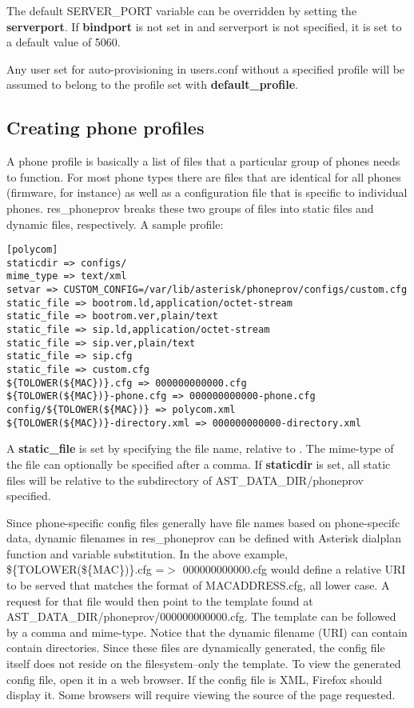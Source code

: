 The default SERVER\_PORT variable can be overridden by setting the \textbf{serverport}.
If \textbf{bindport} is not set in  and serverport is not specified, it 
is set to a default value of 5060.

Any user set for auto-provisioning in users.conf without a specified profile will be 
assumed to belong to the profile set with \textbf{default\_profile}.

\subsection{Creating phone profiles}

A phone profile is basically a list of files that a particular group of phones needs to 
function.  For most phone types there are files that are identical for all phones 
(firmware, for instance) as well as a configuration file that is specific to individual 
phones.  res\_phoneprov breaks these two groups of files into static files and dynamic 
files, respectively. A sample profile:

\begin{astlisting}
\begin{verbatim}
[polycom]
staticdir => configs/
mime_type => text/xml
setvar => CUSTOM_CONFIG=/var/lib/asterisk/phoneprov/configs/custom.cfg
static_file => bootrom.ld,application/octet-stream
static_file => bootrom.ver,plain/text
static_file => sip.ld,application/octet-stream
static_file => sip.ver,plain/text
static_file => sip.cfg
static_file => custom.cfg
${TOLOWER(${MAC})}.cfg => 000000000000.cfg
${TOLOWER(${MAC})}-phone.cfg => 000000000000-phone.cfg
config/${TOLOWER(${MAC})} => polycom.xml
${TOLOWER(${MAC})}-directory.xml => 000000000000-directory.xml
\end{verbatim}
\end{astlisting}

A \textbf{static\_file} is set by specifying the file name, relative to 
.  The mime-type of the file can optionally be specified 
after a comma.  If \textbf{staticdir} is set, all static files will be relative to the 
subdirectory of AST\_DATA\_DIR/phoneprov specified.

Since phone-specific config files generally have file names based on phone-specifc data, 
dynamic filenames in res\_phoneprov can be defined with Asterisk dialplan function and 
variable substitution. In the above example, \$\{TOLOWER(\$\{MAC\})\}.cfg =$>$
000000000000.cfg would define a relative URI to be served that matches the format of 
MACADDRESS.cfg, all lower case. A request for that file would then point to the template 
found at AST\_DATA\_DIR/phoneprov/000000000000.cfg. The template can be followed by a 
comma and mime-type. Notice that the dynamic filename (URI) can contain contain 
directories. Since these files are dynamically generated, the config file itself does not 
reside on the filesystem--only the template. To view the generated config file, open it 
in a web browser. If the config file is XML, Firefox should display it. Some browsers 
will require viewing the source of the page requested.

